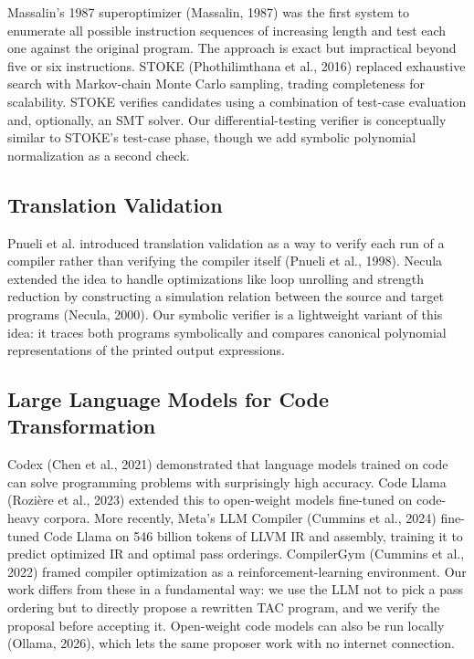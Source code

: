 \documentclass[12pt,a4paper]{report}
\begin{document}
Massalin's 1987 superoptimizer (Massalin, 1987) was the first system to enumerate all possible instruction sequences of increasing length and test each one against the original program. The approach is exact but impractical beyond five or six instructions. STOKE (Phothilimthana et al., 2016) replaced exhaustive search with Markov-chain Monte Carlo sampling, trading completeness for scalability. STOKE verifies candidates using a combination of test-case evaluation and, optionally, an SMT solver. Our differential-testing verifier is conceptually similar to STOKE's test-case phase, though we add symbolic polynomial normalization as a second check.

\subsection{Translation Validation}

Pnueli et al. introduced translation validation as a way to verify each run of a compiler rather than verifying the compiler itself (Pnueli et al., 1998). Necula extended the idea to handle optimizations like loop unrolling and strength reduction by constructing a simulation relation between the source and target programs (Necula, 2000). Our symbolic verifier is a lightweight variant of this idea: it traces both programs symbolically and compares canonical polynomial representations of the printed output expressions.

\subsection{Large Language Models for Code Transformation}

Codex (Chen et al., 2021) demonstrated that language models trained on code can solve programming problems with surprisingly high accuracy. Code Llama (Rozi\`ere et al., 2023) extended this to open-weight models fine-tuned on code-heavy corpora. More recently, Meta's LLM Compiler (Cummins et al., 2024) fine-tuned Code Llama on 546 billion tokens of LLVM IR and assembly, training it to predict optimized IR and optimal pass orderings. CompilerGym (Cummins et al., 2022) framed compiler optimization as a reinforcement-learning environment. Our work differs from these in a fundamental way: we use the LLM not to pick a pass ordering but to directly propose a rewritten TAC program, and we verify the proposal before accepting it. Open-weight code models can also be run locally (Ollama, 2026), which lets the same proposer work with no internet connection.
\end{document}
